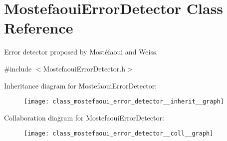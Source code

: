 \hypertarget{class_mostefaoui_error_detector}{}\section{Mostefaoui\+Error\+Detector Class Reference}
\label{class_mostefaoui_error_detector}


Error detector proposed by Mostéfaoui and Weiss.  




{\ttfamily \#include $<$Mostefaoui\+Error\+Detector.\+h$>$}



Inheritance diagram for Mostefaoui\+Error\+Detector\+:
\nopagebreak
\begin{figure}[H]
\begin{center}
\leavevmode
\texttt{[image: class\_mostefaoui\_error\_detector\_\_inherit\_\_graph]}
\end{center}
\end{figure}


Collaboration diagram for Mostefaoui\+Error\+Detector\+:
\nopagebreak
\begin{figure}[H]
\begin{center}
\leavevmode
\texttt{[image: class\_mostefaoui\_error\_detector\_\_coll\_\_graph]}
\end{center}
\end{figure}
